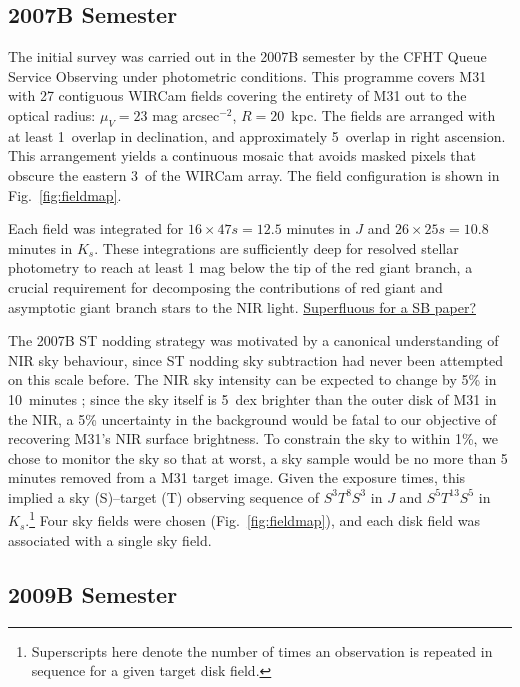\documentclass[iop]{emulateapj}
\newcommand{\changeit}[1]{\textcolor{BrickRed}{\underline{#1}}} %
\newcommand{\Fig}[1]{Fig.~\ref{fig:#1}}  %
\begin{document}
\subsection{2007B Semester} %
\label{sec:obs7}

The initial survey was carried out in the 2007B semester by the CFHT Queue Service Observing under photometric conditions. This programme covers M31 with 27 contiguous WIRCam fields covering the entirety of M31 out to the optical radius: $\mu_V=23$ mag arcsec$^{-2}$, $R=20$~kpc. The fields are arranged with at least 1\arcmin\ overlap in declination, and approximately 5\arcmin\ overlap in right ascension.
This arrangement yields a continuous mosaic that avoids masked pixels that obscure the eastern 3\arcmin\ of the WIRCam array. The field configuration is shown in \Fig{fieldmap}.

Each field was integrated for $16\times 47 s = 12.5$ minutes in $J$ and $26\times 25 s = 10.8$ minutes in $K_s$. These integrations are sufficiently deep for resolved stellar photometry to reach at least 1 mag below the tip of the red giant branch, a crucial requirement for decomposing the contributions of red giant and asymptotic giant branch stars to the NIR light. \changeit{Superfluous for a SB paper?}

The 2007B ST nodding strategy was motivated by a canonical understanding of NIR sky behaviour, since ST nodding sky subtraction had never been attempted on this scale before. The NIR sky intensity can be expected to change by 5\% in 10~minutes \citep{Adams:1996,Vaduvescu:2004}; since the sky itself is 5~dex brighter than the outer disk of M31 in the NIR, a 5\% uncertainty in the background would be fatal to our objective of recovering M31's NIR surface brightness. To constrain the sky to within 1\%, we chose to monitor the sky so that at worst, a sky sample would be no more than 5 minutes removed from a M31 target image. Given the exposure times, this implied a sky (S)--target (T) observing sequence of $S^3T^8S^3$ in $J$ and $S^5T^{13}S^5$ in $K_s$.\footnote{Superscripts here denote the number of times an observation is repeated in sequence for a given target disk field.} Four sky fields were chosen (\Fig{fieldmap}), and each disk field was associated with a single sky field.


\subsection{2009B Semester} %
\label{sub:obs9}
\end{document}
